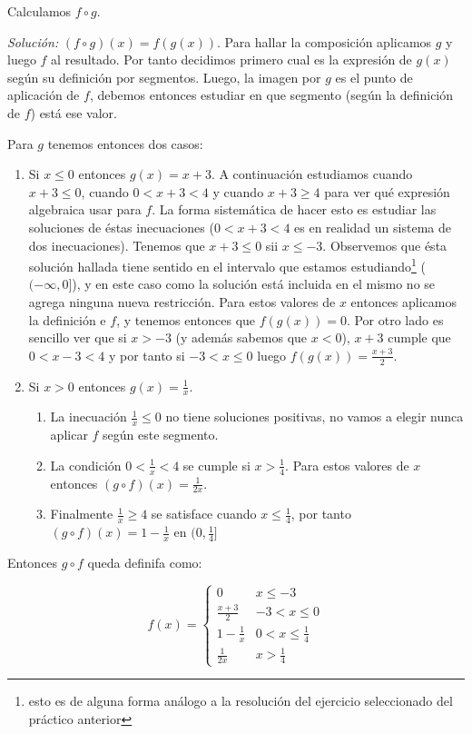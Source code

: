 \documentclass[10pt,a4paper]{article}
\renewcommand{\o}{\circ}
\begin{document}
Calculamos $f \o g$.


\noindent
\emph{Solución:}
$(f \o g)(x) = f (g (x)) $. Para hallar la composición aplicamos
$g$ y luego $f$ al resultado.
Por tanto decidimos primero cual es la expresión de $g(x)$ según su
definición por segmentos. Luego, la imagen por $g$ es el punto de aplicación
de $f$, debemos entonces estudiar en que segmento (según la definición de $f$)
está ese valor.

Para $g$ tenemos entonces dos casos:

\begin{enumerate}
\item Si $x \leq 0$ entonces $g(x) = x+3$. A continuación estudiamos cuando
  $x+3 \leq 0$, cuando $0 < x+3 < 4$ y cuando $x+3 \geq 4$ para ver qué
  expresión algebraica usar para $f$.
  La forma sistemática de hacer esto es estudiar las soluciones de éstas
  inecuaciones ($0 < x+3 < 4$ es en realidad un sistema de dos
  inecuaciones).
  Tenemos que $x+3 \leq 0$ sii $x \leq -3$.
  Observemos que ésta solución hallada tiene
  sentido en el intervalo que estamos estudiando\footnote{esto es de alguna
  forma análogo a la resolución del ejercicio seleccionado del
  práctico anterior} ($(-\infty, 0]$),
  y en este caso como la solución está incluida en el mismo no se agrega
  ninguna nueva restricción.
  Para estos valores de $x$ entonces aplicamos la definición e $f$,
  y tenemos entonces que $f(g(x)) = 0$.
  Por otro lado es sencillo ver que si
  $x> -3$ (y además sabemos que $x<0$),
  $x+3$ cumple que $0<x-3<4$ y por tanto
  si $ -3 < x \leq 0$ luego $f(g(x)) = \frac{x+3}{2}$.
    
\item Si $x > 0$ entonces $g(x) = \frac{1}{x}$.
  \begin{enumerate}
  \item La inecuación $\frac{1}{x} \leq 0$ no tiene soluciones positivas,
    no vamos a elegir nunca aplicar $f$ según este segmento.

  \item La condición $0 < \frac{1}{x}< 4$ se cumple si $ x > \frac{1}{4}$.
    Para estos valores de $x$ entonces $(g\o f) (x) = \frac{1}{2x}$.
    
  \item Finalmente $\frac{1}{x} \geq 4$ se satisface cuando
    $x \leq \frac{1}{4}$, por tanto  $(g\o f) (x) = 1 - \frac{1}{x}$ en
    $(0,\frac{1}{4}]$
   
  \end{enumerate}
  
\end{enumerate}


Entonces $g \o f$ queda definifa como:

$$
f(x) = \left \{
\begin{matrix} 0 & x \leq -3
  \\ \frac{x+3}{2} & -3 < x \leq 0 
  \\ 1- \frac{1}{x} &  0 < x \leq \frac{1}{4}
  \\ \frac{1}{2x} & x > \frac{1}{4}
\end{matrix}\right.
$$
\end{document}
